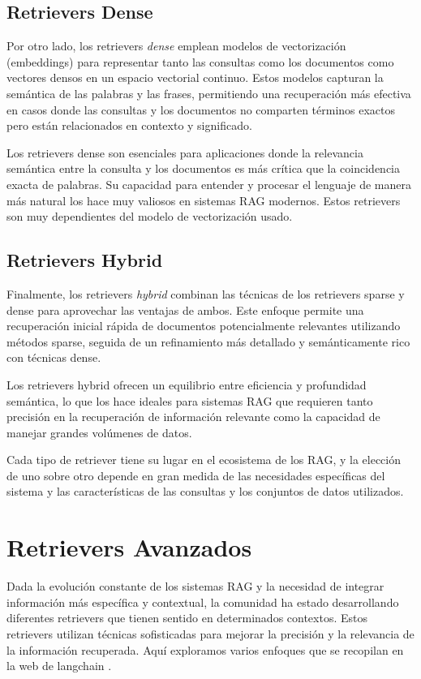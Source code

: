 \subsection{Retrievers Dense}

Por otro lado, los retrievers \textit{dense} emplean modelos de vectorización (embeddings) para representar tanto las consultas como los documentos como vectores densos en un espacio vectorial continuo. Estos modelos capturan la semántica de las palabras y las frases, permitiendo una recuperación más efectiva en casos donde las consultas y los documentos no comparten términos exactos pero están relacionados en contexto y significado. \citep{lewis2020retrieval}

Los retrievers dense son esenciales para aplicaciones donde la relevancia semántica entre la consulta y los documentos es más crítica que la coincidencia exacta de palabras. Su capacidad para entender y procesar el lenguaje de manera más natural los hace muy valiosos en sistemas RAG modernos. Estos retrievers son muy dependientes del modelo de vectorización usado.

\subsection{Retrievers Hybrid}

Finalmente, los retrievers \textit{hybrid} combinan las técnicas de los retrievers sparse y dense para aprovechar las ventajas de ambos. Este enfoque permite una recuperación inicial rápida de documentos potencialmente relevantes utilizando métodos sparse, seguida de un refinamiento más detallado y semánticamente rico con técnicas dense.

Los retrievers hybrid ofrecen un equilibrio entre eficiencia y profundidad semántica, lo que los hace ideales para sistemas RAG que requieren tanto precisión en la recuperación de información relevante como la capacidad de manejar grandes volúmenes de datos.

Cada tipo de retriever tiene su lugar en el ecosistema de los RAG, y la elección de uno sobre otro depende en gran medida de las necesidades específicas del sistema y las características de las consultas y los conjuntos de datos utilizados.

\section{Retrievers Avanzados}

Dada la evolución constante de los sistemas RAG y la necesidad de integrar información más específica y contextual, la comunidad ha estado desarrollando diferentes retrievers que tienen sentido en determinados contextos. Estos retrievers utilizan técnicas sofisticadas para mejorar la precisión y la relevancia de la información recuperada. Aquí exploramos varios enfoques que se recopilan en la web de langchain \citep{langchainretrievers}.


